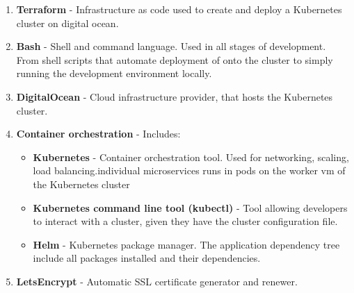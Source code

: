 \begin{enumerate}
    \item \textbf{Terraform} - Infrastructure as code used to create and deploy a Kubernetes cluster on digital ocean.
    \item \textbf{Bash} - Shell and command language. Used in all stages of development. From shell scripts that automate deployment of \mini onto the cluster to simply running the development environment locally.
    \item \textbf{DigitalOcean} - Cloud infrastructure provider, that hosts the Kubernetes cluster.
    \item \textbf{Container orchestration} - Includes:
    \begin{itemize}
        \item \textbf{Kubernetes} - Container orchestration tool. Used for networking, scaling, load  balancing.\mini individual microservices runs in pods on the worker vm of the Kubernetes cluster
        \item \textbf{Kubernetes command line tool (kubectl)} - Tool allowing developers to interact with a cluster, given they have the cluster configuration file.
        \item \textbf{Helm} - Kubernetes package manager. The application dependency tree include all packages installed and their dependencies.
    \end{itemize}
    \item \textbf{LetsEncrypt} - Automatic SSL certificate generator and renewer.
\end{enumerate}



